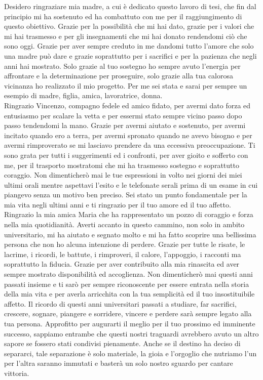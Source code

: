\documentclass[12pt,a4paper,oneside]{book}
\begin{document}
Desidero ringraziare mia madre, a cui è dedicato questo lavoro di tesi, che fin dal principio mi ha sostenuto ed ha combattuto con me per il raggiungimento di questo obiettivo. Grazie per la possibilità che mi hai dato, grazie per i valori che mi hai trasmesso e per gli insegnamenti che mi hai donato rendendomi ciò che sono oggi. Grazie per aver sempre creduto in me dandomi tutto l'amore che solo una madre può dare e grazie soprattutto per i sacrifici e per la pazienza che negli anni hai mostrato. Solo grazie al tuo sostegno ho sempre avuto l'energia per affrontare e la determinazione per proseguire, solo grazie alla tua calorosa vicinanza ho realizzato il mio progetto. Per me sei stata e sarai per sempre un esempio di madre, figlia, amica, lavoratrice, donna.\\
Ringrazio Vincenzo, compagno fedele ed amico fidato, per avermi dato forza ed entusiasmo per scalare la vetta e per essermi stato sempre vicino passo dopo passo tendendomi la mano. Grazie per avermi aiutato e sostenuto, per avermi incitato quando ero a terra, per avermi spronato quando ne avevo bisogno e per avermi rimproverato se mi lasciavo prendere da una eccessiva preoccupazione. Ti sono grata per tutti i suggerimenti ed i confronti, per aver gioito e sofferto con me, per il trasporto mostratomi che mi ha trasmesso sostegno e soprattutto coraggio. Non dimenticherò mai le tue espressioni in volto nei giorni dei miei ultimi orali mentre aspettavi l'esito e le telefonate serali prima di un esame in cui piangevo senza un motivo ben preciso. Sei stato un punto fondamentale per la mia vita negli ultimi anni e ti ringrazio per il tuo amore ed il tuo affetto.\\
Ringrazio la mia amica Maria che ha rappresentato un pozzo di coraggio e forza nella mia quotidianità. Averti accanto in questo cammino, non solo in ambito universitario, mi ha aiutato e segnato molto e mi ha fatto scoprire una bellissima persona che non ho alcuna intenzione di perdere. Grazie per tutte le risate, le lacrime, i ricordi, le battute, i rimproveri, il calore, l'appoggio, i racconti ma soprattutto la fiducia. Grazie per aver contribuito alla mia rinascita ed aver sempre mostrato disponibilità ed accoglienza. Non dimenticherò mai questi anni passati insieme e ti sarò per sempre riconoscente per essere entrata nella storia della mia vita e per averla arricchita con la tua semplicità ed il tuo insostituibile affetto. Il ricordo di questi anni universitari passati a studiare, far sacrifici, crescere, sognare, piangere e sorridere, vincere e perdere sarà sempre legato alla tua persona. Approfitto per augurarti il meglio per il tuo prossimo ed imminente successo, sappiamo entrambe che questi nostri traguardi avrebbero avuto un altro sapore se fossero stati condivisi pienamente. Anche se il destino ha deciso di separarci, tale separazione è solo materiale, la gioia e l'orgoglio che nutriamo l'un per l'altra saranno immutati e basterà un solo nostro sguardo per cantare vittoria.\\
\end{document}
